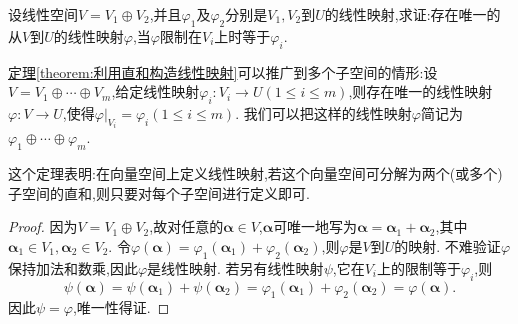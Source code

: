 \documentclass[../../main.tex]{subfiles}%
\begin{document}
\begin{theorem}\label{theorem:利用直和构造线性映射}
设线性空间\(V = V_1\oplus V_2\),并且\(\varphi_1\)及\(\varphi_2\)分别是\(V_1,V_2\)到\(U\)的线性映射,求证:存在唯一的从\(V\)到\(U\)的线性映射\(\varphi\),当\(\varphi\)限制在\(V_i\)上时等于\(\varphi_i\).
\end{theorem}
\begin{remark}
\hyperref[theorem:利用直和构造线性映射]{定理\ref{theorem:利用直和构造线性映射}}可以推广到多个子空间的情形:设\(V = V_1\oplus\cdots\oplus V_m\),给定线性映射\(\varphi_i:V_i\to U(1\leqslant  i\leqslant  m)\),则存在唯一的线性映射\(\varphi:V\to U\),使得\(\left.\varphi\right|_{V_i}=\varphi_i(1\leqslant  i\leqslant  m)\). 我们可以把这样的线性映射\(\varphi\)简记为\(\varphi_1\oplus\cdots\oplus\varphi_m\).
\end{remark}
\begin{note}
这个定理表明:在向量空间上定义线性映射,若这个向量空间可分解为两个(或多个)子空间的直和,则只要对每个子空间进行定义即可.
\end{note}
\begin{proof}
因为\(V = V_1\oplus V_2\),故对任意的\(\boldsymbol{\alpha}\in V\),\(\boldsymbol{\alpha}\)可唯一地写为\(\boldsymbol{\alpha}=\boldsymbol{\alpha}_1+\boldsymbol{\alpha}_2\),其中\(\boldsymbol{\alpha}_1\in V_1,\boldsymbol{\alpha}_2\in V_2\). 令\(\varphi(\boldsymbol{\alpha})=\varphi_1(\boldsymbol{\alpha}_1)+\varphi_2(\boldsymbol{\alpha}_2)\),则\(\varphi\)是\(V\)到\(U\)的映射. 不难验证\(\varphi\)保持加法和数乘,因此\(\varphi\)是线性映射. 若另有线性映射\(\psi\),它在\(V_i\)上的限制等于\(\varphi_i\),则
\[
\psi(\boldsymbol{\alpha})=\psi(\boldsymbol{\alpha}_1)+\psi(\boldsymbol{\alpha}_2)=\varphi_1(\boldsymbol{\alpha}_1)+\varphi_2(\boldsymbol{\alpha}_2)=\varphi(\boldsymbol{\alpha}).
\]
因此\(\psi = \varphi\),唯一性得证.
\end{proof}
\end{document}
